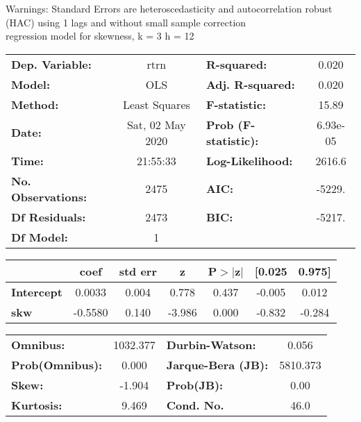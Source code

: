 Warnings: \newline
 [1] Standard Errors are heteroscedasticity and autocorrelation robust (HAC) using 1 lags and without small sample correction\\ 

regression model for skewness, k = 3 h = 12\begin{center}
\begin{tabular}{lclc}
\toprule
\textbf{Dep. Variable:}    &       rtrn       & \textbf{  R-squared:         } &     0.020   \\
\textbf{Model:}            &       OLS        & \textbf{  Adj. R-squared:    } &     0.020   \\
\textbf{Method:}           &  Least Squares   & \textbf{  F-statistic:       } &     15.89   \\
\textbf{Date:}             & Sat, 02 May 2020 & \textbf{  Prob (F-statistic):} &  6.93e-05   \\
\textbf{Time:}             &     21:55:33     & \textbf{  Log-Likelihood:    } &    2616.6   \\
\textbf{No. Observations:} &        2475      & \textbf{  AIC:               } &    -5229.   \\
\textbf{Df Residuals:}     &        2473      & \textbf{  BIC:               } &    -5217.   \\
\textbf{Df Model:}         &           1      & \textbf{                     } &             \\
\bottomrule
\end{tabular}
\begin{tabular}{lcccccc}
                   & \textbf{coef} & \textbf{std err} & \textbf{z} & \textbf{P$> |$z$|$} & \textbf{[0.025} & \textbf{0.975]}  \\
\midrule
\textbf{Intercept} &       0.0033  &        0.004     &     0.778  &         0.437        &       -0.005    &        0.012     \\
\textbf{skw}       &      -0.5580  &        0.140     &    -3.986  &         0.000        &       -0.832    &       -0.284     \\
\bottomrule
\end{tabular}
\begin{tabular}{lclc}
\textbf{Omnibus:}       & 1032.377 & \textbf{  Durbin-Watson:     } &    0.056  \\
\textbf{Prob(Omnibus):} &   0.000  & \textbf{  Jarque-Bera (JB):  } & 5810.373  \\
\textbf{Skew:}          &  -1.904  & \textbf{  Prob(JB):          } &     0.00  \\
\textbf{Kurtosis:}      &   9.469  & \textbf{  Cond. No.          } &     46.0  \\
\bottomrule
\end{tabular}
\end{center}

